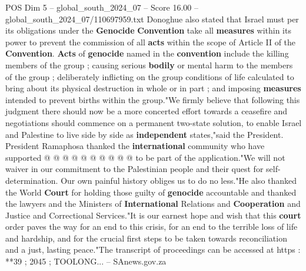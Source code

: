 \begin{textsample}{POS Dim 5 – global\_south\_2024\_07 – Score 16.00 – global\_south\_2024\_07/110697959.txt}
Donoghue also stated that Israel must per its obligations under the \textbf{Genocide} \textbf{Convention} take all \textbf{measures} within its power to prevent the commission of all \textbf{acts} within the scope of Article II of the \textbf{Convention}. \textbf{Acts} of \textbf{genocide} named in the \textbf{convention} include the killing members of the group ; causing serious \textbf{bodily} or mental harm to the members of the group ; deliberately inflicting on the group conditions of life calculated to bring about its physical destruction in whole or in part ; and imposing \textbf{measures} intended to prevent births within the group."We firmly believe that following this judgment there should now be a more concerted effort towards a ceasefire and negotiations should commence on a permanent two-state solution, to enable Israel and Palestine to live side by side as \textbf{independent} states,"said the President.
President Ramaphosa thanked the \textbf{international} community who have supported @ @ @ @ @ @ @ @ @ @ to be part of the application."We will not waiver in our commitment to the Palestinian people and their quest for self-determination.
Our own painful history obliges us to do no less."He also thanked the World \textbf{Court} for holding those guilty of \textbf{genocide} accountable and thanked the lawyers and the Ministers of \textbf{International} Relations and \textbf{Cooperation} and Justice and Correctional Services."It is our earnest hope and wish that this \textbf{court} order paves the way for an end to this crisis, for an end to the terrible loss of life and hardship, and for the crucial first steps to be taken towards reconciliation and a just, lasting peace."The transcript of proceedings can be accessed at https : **39 ; 2045 ; TOOLONG... -- SAnews.gov.za

\end{textsample}
